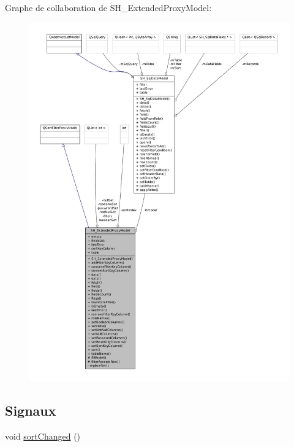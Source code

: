 Graphe de collaboration de S\-H\-\_\-\-Extended\-Proxy\-Model\-:\nopagebreak
\begin{figure}[H]
\begin{center}
\leavevmode
\includegraphics[width=350pt]{classSH__ExtendedProxyModel__coll__graph}
\end{center}
\end{figure}
\subsection*{Signaux}
\begin{DoxyCompactItemize}
\item 
void \hyperlink{classSH__ExtendedProxyModel_a573590c2763d06d07c6509d4c91a06b2}{sort\-Changed} ()
\end{DoxyCompactItemize}
